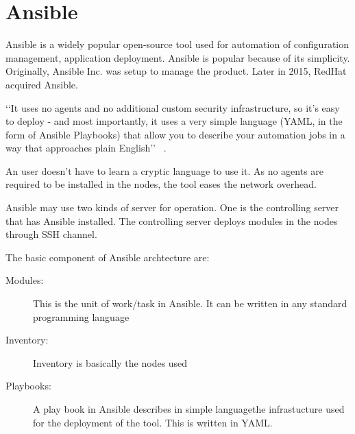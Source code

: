 \section{Ansible}


Ansible is a widely popular open-source tool used for automation of
configuration management, application deployment. Ansible is popular
because of its simplicity. Originally, Ansible Inc.  was setup to
manage the product. Later in 2015, RedHat acquired Ansible.

‘‘It uses no agents and no additional custom security infrastructure,
so it’s easy to deploy - and most importantly, it uses a very simple
language (YAML, in the form of Ansible Playbooks) that allow you to
describe your automation jobs in a way that approaches plain
English’’ ~\cite {hid-sp18-417-doc-Ansible}.

An user doesn’t have to learn a cryptic language to use it.  As no
agents are required to be installed in the nodes, the tool eases the
network overhead.

Ansible may use two kinds of server for operation. One is the
controlling server that has Ansible installed.  The controlling server
deploys modules in the nodes through SSH channel.

The basic component of Ansible archtecture are: 

\begin{description}

\item[Modules:] This is the unit of work/task in Ansible. It
  can be written in any standard programming language

\item[Inventory:] Inventory is basically the nodes used

\item[Playbooks:] A play book in Ansible describes in simple
  languagethe infrastucture used for the deployment of the tool. This
  is written in YAML.

\end{description}


